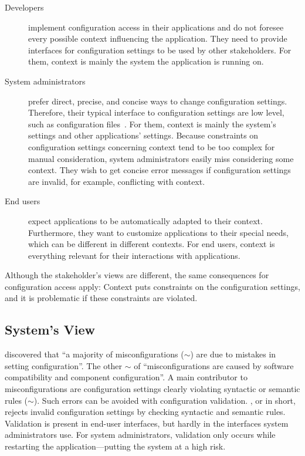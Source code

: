 \begin{description}
\item[Developers] implement configuration access in their applications and do not foresee every possible context influencing the application.
They need to provide interfaces for configuration settings to be used by other stakeholders.
For them, context is mainly the system the application is running on.

\item[System administrators] prefer direct, precise, and concise ways to change configuration settings.
Therefore, their typical interface to configuration settings are low level, such as configuration files~\cite{barrett2003system,barrett2004field,haber2007design,velasquez2008designing,zhang2014configuration}.
For them, context is mainly the system's settings and other applications' settings.
Because constraints on configuration settings concerning context tend to be too complex for manual consideration, system administrators easily miss considering some context.
They wish to get concise error messages if configuration settings are invalid, for example, conflicting with context.

\item[End users] expect applications to be automatically adapted to their context.
Furthermore, they want to customize applications to their special needs, which can be different in different contexts.
For end users, context is everything relevant for their interactions with applications.
\end{description}

Although the stakeholder's views are different, the same consequences for configuration access apply:
Context puts constraints on the configuration settings, and it is problematic if these constraints are violated.

\subsection{System's View}

\citet{yin2011empirical} discovered that \enquote{a majority of misconfigurations ($\sim$) are due to mistakes in setting configuration}.
The other $\sim$ of \enquote{misconfigurations are caused by software compatibility and component configuration}.
A main contributor to misconfigurations are configuration settings clearly violating syntactic or semantic rules ($\sim$).
Such errors can be avoided with configuration validation.
, or  in short, rejects invalid configuration settings by checking syntactic and semantic rules.
Validation is present in end-user interfaces, but hardly in the interfaces system administrators use.
For system administrators, validation only occurs while restarting the application---putting the system at a high risk.


